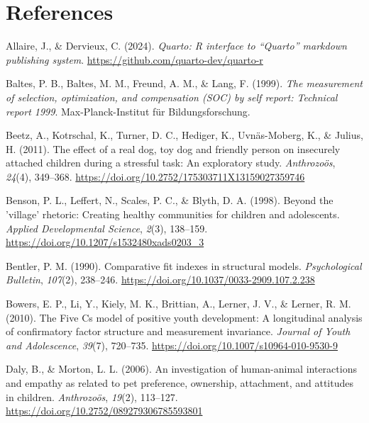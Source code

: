 \documentclass[
  jou,
  longtable,
  nolmodern,
  notxfonts,
  notimes,
  colorlinks=true,linkcolor=blue,citecolor=blue,urlcolor=blue]{apa7}
\newlength{\cslhangindent}
\newenvironment{CSLReferences}[2] %
 {\begin{list}{}{%
  \setlength{\itemindent}{0pt}
  \setlength{\leftmargin}{0pt}
  \setlength{\parsep}{0pt}
  \ifodd #1
   \setlength{\leftmargin}{\cslhangindent}
   \setlength{\itemindent}{-1\cslhangindent}
  \fi
  \setlength{\itemsep}{#2\baselineskip}}}
 {\end{list}}
\begin{document}
\section{References}\label{references}

\label{refs}
\begin{CSLReferences}{1}{0}
Allaire, J., \& Dervieux, C. (2024). \emph{Quarto: R interface to
{``{Quarto}''} markdown publishing system}.
\url{https://github.com/quarto-dev/quarto-r}

Baltes, P. B., Baltes, M. M., Freund, A. M., \& Lang, F. (1999).
\emph{The measurement of selection, optimization, and compensation
({SOC}) by self report: Technical report 1999}. Max-Planck-Institut
f{ü}r Bildungsforschung.

Beetz, A., Kotrschal, K., Turner, D. C., Hediger, K., Uvnäs-Moberg, K.,
\& Julius, H. (2011). The effect of a real dog, toy dog and friendly
person on insecurely attached children during a stressful task: An
exploratory study. \emph{Anthrozo{ö}s}, \emph{24}(4), 349--368.
\url{https://doi.org/10.2752/175303711X13159027359746}

Benson, P. L., Leffert, N., Scales, P. C., \& Blyth, D. A. (1998).
Beyond the 'village' rhetoric: Creating healthy communities for children
and adolescents. \emph{Applied Developmental Science}, \emph{2}(3),
138--159. \url{https://doi.org/10.1207/s1532480xads0203_3}

Bentler, P. M. (1990). Comparative fit indexes in structural models.
\emph{Psychological Bulletin}, \emph{107}(2), 238--246.
\url{https://doi.org/10.1037/0033-2909.107.2.238}

Bowers, E. P., Li, Y., Kiely, M. K., Brittian, A., Lerner, J. V., \&
Lerner, R. M. (2010). The {Five Cs} model of positive youth development:
A longitudinal analysis of confirmatory factor structure and measurement
invariance. \emph{Journal of Youth and Adolescence}, \emph{39}(7),
720--735. \url{https://doi.org/10.1007/s10964-010-9530-9}

Daly, B., \& Morton, L. L. (2006). An investigation of human-animal
interactions and empathy as related to pet preference, ownership,
attachment, and attitudes in children. \emph{Anthrozo{ö}s},
\emph{19}(2), 113--127. \url{https://doi.org/10.2752/089279306785593801}


\end{CSLReferences}
\end{document}
